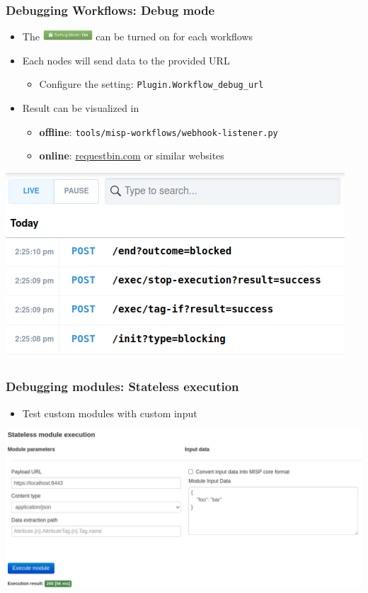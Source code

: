 \begin{frame}
    \frametitle{Debugging Workflows: Debug mode}
    \begin{itemize}
        \item The \includegraphics[width=70px]{pictures/debug-mode.png} can be turned on for each workflows
        \item Each nodes will send data to the provided URL
        \begin{itemize}
            \item Configure the setting: \texttt{Plugin.Workflow\_debug\_url}
        \end{itemize}
        \item Result can be visualized in
        \begin{itemize}
            \item \textbf{offline}: \texttt{tools/misp-workflows/webhook-listener.py}
            \item \textbf{online}: \url{requestbin.com} or similar websites
        \end{itemize}
    \end{itemize}
    \begin{center}
        \includegraphics[width=0.6\linewidth]{pictures/request-bin.png}
    \end{center}
\end{frame}

\begin{frame}
    \frametitle{Debugging modules: Stateless execution}
    \begin{itemize}
        \item Test custom modules with custom input
    \end{itemize}
    \begin{center}
        \includegraphics[width=1.0\linewidth]{pictures/stateless-execution.png}
    \end{center}
\end{frame}

